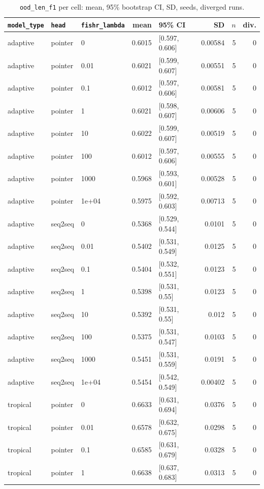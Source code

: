 \documentclass[10pt]{article}
\begin{document}
{\small
\begin{longtable}{lllrlrrr}
\caption{\texttt{ood\_len\_f1} per cell: mean, 95\% bootstrap CI, SD, seeds, diverged runs.}\label{tab:summary-ood_len_f1}\\
\toprule
\texttt{model\_type} & \texttt{head} & \texttt{fishr\_lambda} & mean & 95\% CI & SD & $n$ & div.\\
\midrule
\endhead
adaptive & pointer & 0 & 0.6015 & [0.597, 0.606] & 0.00584 & 5 & 0\\
adaptive & pointer & 0.01 & 0.6021 & [0.599, 0.607] & 0.00551 & 5 & 0\\
adaptive & pointer & 0.1 & 0.6012 & [0.597, 0.606] & 0.00581 & 5 & 0\\
adaptive & pointer & 1 & 0.6021 & [0.598, 0.607] & 0.00606 & 5 & 0\\
adaptive & pointer & 10 & 0.6022 & [0.599, 0.607] & 0.00519 & 5 & 0\\
adaptive & pointer & 100 & 0.6012 & [0.597, 0.606] & 0.00555 & 5 & 0\\
adaptive & pointer & 1000 & 0.5968 & [0.593, 0.601] & 0.00528 & 5 & 0\\
adaptive & pointer & 1e+04 & 0.5975 & [0.592, 0.603] & 0.00713 & 5 & 0\\
adaptive & seq2seq & 0 & 0.5368 & [0.529, 0.544] & 0.0101 & 5 & 0\\
adaptive & seq2seq & 0.01 & 0.5402 & [0.531, 0.549] & 0.0125 & 5 & 0\\
adaptive & seq2seq & 0.1 & 0.5404 & [0.532, 0.551] & 0.0123 & 5 & 0\\
adaptive & seq2seq & 1 & 0.5398 & [0.531, 0.55] & 0.0123 & 5 & 0\\
adaptive & seq2seq & 10 & 0.5392 & [0.531, 0.55] & 0.012 & 5 & 0\\
adaptive & seq2seq & 100 & 0.5375 & [0.531, 0.547] & 0.0103 & 5 & 0\\
adaptive & seq2seq & 1000 & 0.5451 & [0.531, 0.559] & 0.0191 & 5 & 0\\
adaptive & seq2seq & 1e+04 & 0.5454 & [0.542, 0.549] & 0.00402 & 5 & 0\\
tropical & pointer & 0 & 0.6633 & [0.631, 0.694] & 0.0376 & 5 & 0\\
tropical & pointer & 0.01 & 0.6578 & [0.632, 0.675] & 0.0298 & 5 & 0\\
tropical & pointer & 0.1 & 0.6585 & [0.631, 0.679] & 0.0328 & 5 & 0\\
tropical & pointer & 1 & 0.6638 & [0.637, 0.683] & 0.0313 & 5 & 0\\

\end{longtable}}
\end{document}
